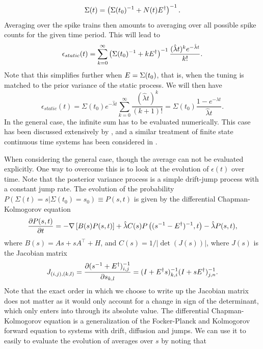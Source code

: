 \[
\Sigma(t) = \left(\Sigma(t_0)^{-1} + N(t) E^\dagger\right)^{-1}.
\]
Averaging over the spike trains then amounts to averaging over all possible spike counts for the given time period. This will lead to
\begin{equation}
\epsilon_{static}(t) = \sum_{k=0}^\infty  \left(\Sigma(t_0)^{-1} + k E^\dagger\right)^{-1} \frac{ (\hat{\lambda}t)^k e^{-\hat{\lambda} t }}{k!}.
\end{equation}
Note that this simplifies further when $E = \Sigma(t_0)$, that is, when the tuning is matched to the prior variance of the static process. We will then have
\begin{equation}
\epsilon_{static}(t) =\Sigma(t_0)e^{-\hat{\lambda} t}  \sum_{k=0}^\infty  \frac{ (\hat{\lambda}t)^k }{(k+1)!} = \Sigma(t_0) \frac{1-e^{-\hat{\lambda} t }}{\hat{\lambda} t}.
\end{equation}
In the general case, the infinite sum has to be evaluated numerically. This case has been discussed extensively by \citet{Yaeli2010}, and a similar treatment of finite state continuous time systems has been considered in \citet{Bobrowski2009}.\par
When considering the general case, though the average can not be evaluated explicitly. One way to overcome this is to look at the evolution of $\epsilon(t)$ over time. Note that the posterior variance process is a simple drift-jump process with a constant jump rate. The evolution of the probability $P(\Sigma(t) = s | \Sigma(t_0) = s_0) \equiv P(s,t)$ is given by the differential Chapman-Kolmogorov equation\cite{Gardiner2004}
\begin{equation}
\label{eq:sigma_DCKE}
\frac{\partial P(s,t)}{\partial t} = -\nabla \left[B(s) P(s,t)\right] + \hat{\lambda} C(s) P\left( (s^{-1} - \covar^\dagger)^{-1},t\right) - \hat{\lambda} P(s,t),
\end{equation}
where $B(s) = A s + s A^\top + H$, and  $C(s) = 1/|\det(J(s))|$, where $J(s)$ is the Jacobian matrix
\[
J_{(i,j),(k,l)} = \frac{\partial (s^{-1}+E^\dagger)^{-1}_{i,j}}{\partial s_{k,l}} = (I+E^\dagger s)^{-1}_{k,i}(I+s E^\dagger)^{-1}_{j,n}.
\]
Note that the exact order in which we choose to write up the Jacobian matrix does not matter as it would only account for a change in sign of the determinant, which only enters into  through its absolute value. The differential Chapman-Kolmogorov equation is a generalization of the Focker-Planck and Kolmogorov forward equation to systems with drift, diffusion and jumps. We can use it to easily to evaluate the evolution of averages over $s$ by noting that
